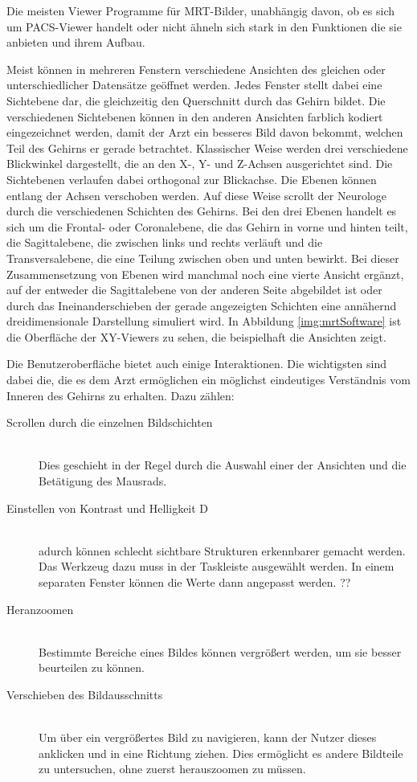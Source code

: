 Die meisten Viewer Programme für MRT-Bilder, unabhängig davon, ob es sich um PACS-Viewer handelt oder nicht ähneln sich stark in den Funktionen die sie anbieten und ihrem Aufbau.

Meist können in mehreren Fenstern verschiedene Ansichten des gleichen oder unterschiedlicher Datensätze geöffnet werden. Jedes Fenster stellt dabei eine Sichtebene dar, die gleichzeitig den Querschnitt durch das Gehirn bildet. Die verschiedenen Sichtebenen können in den anderen Ansichten farblich kodiert eingezeichnet werden, damit der Arzt ein besseres Bild davon bekommt, welchen Teil des Gehirns er gerade betrachtet.
Klassischer Weise werden drei verschiedene Blickwinkel dargestellt, die an den X-, Y- und Z-Achsen ausgerichtet sind. Die Sichtebenen verlaufen dabei orthogonal zur Blickachse. Die Ebenen können entlang der Achsen verschoben werden. Auf diese Weise scrollt der Neurologe durch die verschiedenen Schichten des Gehirns. 
Bei den drei Ebenen handelt es sich um die Frontal- oder Coronalebene, die das Gehirn in vorne und hinten teilt, die Sagittalebene, die zwischen links und rechts verläuft und die Transversalebene, die eine Teilung zwischen oben und unten bewirkt.  
Bei dieser Zusammensetzung von Ebenen wird manchmal noch eine vierte Ansicht ergänzt, auf der entweder die Sagittalebene von der anderen Seite abgebildet ist oder durch das Ineinanderschieben der gerade angezeigten Schichten eine annähernd dreidimensionale Darstellung simuliert wird. 
In Abbildung \ref{img:mrtSoftware} ist die Oberfläche der XY-Viewers zu sehen, die beispielhaft die Ansichten zeigt.

Die Benutzeroberfläche bietet auch einige Interaktionen. Die wichtigsten sind dabei die, die es dem Arzt ermöglichen ein möglichst eindeutiges Verständnis vom Inneren des Gehirns zu erhalten.  Dazu zählen:

\begin{description}
\item [Scrollen durch die einzelnen Bildschichten]\hfill \\
Dies geschieht in der Regel durch die Auswahl einer der Ansichten und die Betätigung des Mausrads. 
\item [Einstellen von Kontrast und Helligkeit D]\hfill \\
adurch können schlecht sichtbare Strukturen erkennbarer gemacht werden. Das Werkzeug dazu muss in der Taskleiste ausgewählt werden. In einem separaten Fenster können die Werte dann angepasst werden. ??
\item [Heranzoomen]\hfill \\
Bestimmte Bereiche eines Bildes können vergrößert werden, um sie besser beurteilen zu können.
\item [Verschieben des Bildausschnitts]\hfill \\
Um über ein vergrößertes Bild zu navigieren, kann der Nutzer dieses anklicken und in eine Richtung ziehen. Dies ermöglicht es andere Bildteile zu untersuchen, ohne zuerst herauszoomen zu müssen.
\end{description}

